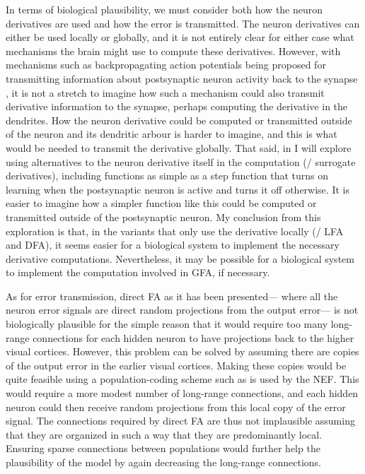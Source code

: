 In terms of biological plausibility,
we must consider both how the neuron derivatives are used
and how the error is transmitted.
The neuron derivatives can either be used locally or globally,
and it is not entirely clear for either case
what mechanisms the brain might use to compute these derivatives.
However, with mechanisms such as backpropagating action potentials
being proposed for transmitting information about postsynaptic neuron activity
back to the synapse \parencite{Waters2005},
it is not a stretch to imagine how such a mechanism could also transmit
derivative information to the synapse,
perhaps computing the derivative in the dendrites.
How the neuron derivative could be computed or transmitted
outside of the neuron and its dendritic arbour is harder to imagine,
and this is what would be needed to transmit the derivative globally.
That said, in  I will explore using alternatives
to the neuron derivative itself in the computation (\ie/ surrogate derivatives),
including functions as simple as a step function
that turns on learning when the postsynaptic neuron is active
and turns it off otherwise.
It is easier to imagine how a simpler function like this
could be computed or transmitted outside of the postsynaptic neuron.
My conclusion from this exploration is that,
in the variants that only use the derivative locally (\ie/ LFA and DFA),
it seems easier for a biological system to implement the necessary
derivative computations.
Nevertheless, it may be possible for a biological system to implement
the computation involved in GFA, if necessary.

As for error transmission,
direct FA as it has been presented---%
where all the neuron error signals are direct random projections
from the output error---%
is not biologically plausible for the simple reason
that it would require too many long-range connections for each hidden neuron
to have projections back to the higher visual cortices.
However, this problem can be solved
by assuming there are copies of the output error
in the earlier visual cortices.
Making these copies would be quite feasible using a population-coding scheme
such as is used by the NEF.
This would require a more modest number of long-range connections,
and each hidden neuron could then receive random projections
from this local copy of the error signal.
The connections required by direct FA are thus not implausible
assuming that they are organized in such a way that they are predominantly local.
Ensuring sparse connections between populations would further help
the plausibility of the model by again decreasing the long-range connections.

